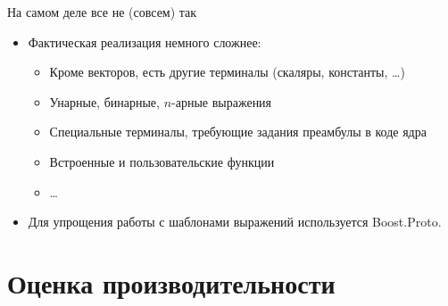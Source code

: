 \documentclass[@BEAMER_OPTIONS@]{beamer}
\begin{document}
\note{ }

\begin{frame}[fragile]{На самом деле все не (совсем) так}
    \begin{itemize}
        \item Фактическая реализация немного сложнее:
            \begin{itemize}
                \item Кроме векторов, есть другие терминалы (скаляры,
                    константы, \ldots)
                \item Унарные, бинарные, $n$-арные выражения
                \item Специальные терминалы, требующие задания
                    преамбулы в коде ядра
                \item Встроенные и пользовательские функции
                \item \ldots
            \end{itemize}
            \vspace{\baselineskip}
        \item Для упрощения работы с шаблонами выражений используется
            Boost.Proto.
    \end{itemize}
\end{frame}


\section{Оценка производительности}

\begin{frame}
    \sectionpage
\end{frame}

\note{ }
\end{document}
